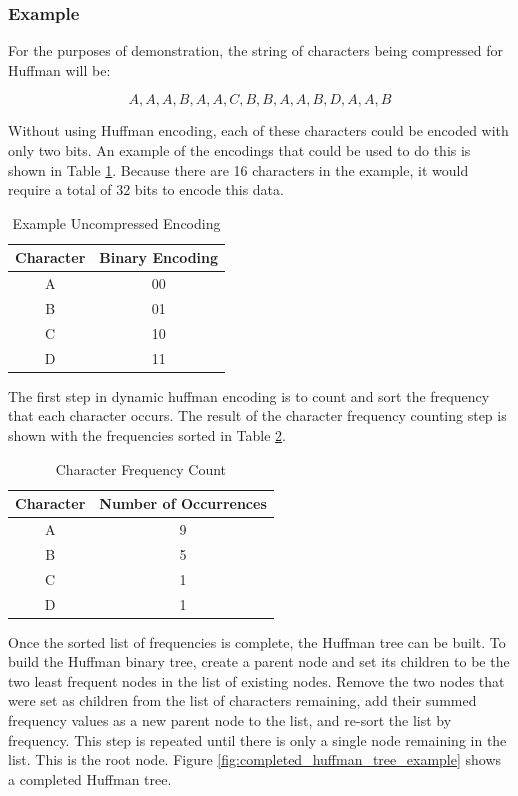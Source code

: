 \documentclass[doublespace,nopageskip]{VTthesis}
\begin{document}
\subsubsection{Example}\label{sss:huffman_example}
For the purposes of demonstration, the string of characters being compressed for Huffman will be:

\[A,A,A,B,A,A,C,B,B,A,A,B,D,A,A,B\]

Without using Huffman encoding, each of these characters could be encoded with only two bits. An example of the encodings that could be used to do this is shown in Table \ref{tab:default_encoding}. Because there are 16 characters in the example, it would require a total of 32 bits to encode this data.

\begin{table}[htb]
	\centering
	\caption{Example Uncompressed Encoding}
	\begin{tabular}{cc}
	    \toprule
	    Character & Binary Encoding\\
	    \midrule
	    A & 00 \\
	    \midrule
	    B & 01 \\
	    \midrule
	    C & 10 \\
	    \midrule
	    D & 11 \\
	    \bottomrule
	\end{tabular}
	\label{tab:default_encoding}
\end{table}

The first step in dynamic huffman encoding is to count and sort the frequency that each character occurs. The result of the character frequency counting step is shown with the frequencies sorted in Table \ref{tab:character_frequency_count}.

\begin{table}[htb]
	\centering
	\caption{Character Frequency Count}
	\begin{tabular}{cc}
	    \toprule
	    Character & Number of Occurrences\\
	    \midrule
	    A & 9 \\
	    \midrule
	    B & 5 \\
	    \midrule
	    C & 1 \\
	    \midrule
	    D & 1 \\
	    \bottomrule
	\end{tabular}
	\label{tab:character_frequency_count}
\end{table}

Once the sorted list of frequencies is complete, the Huffman tree can be built. To build the Huffman binary tree, create a parent node and set its children to be the two least frequent nodes in the list of existing nodes. Remove the two nodes that were set as children from the list of characters remaining, add their summed frequency values as a new parent node to the list, and re-sort the list by frequency. This step is repeated until there is only a single node remaining in the list. This is the root node. Figure \ref{fig:completed_huffman_tree_example} shows a completed Huffman tree.
\end{document}
